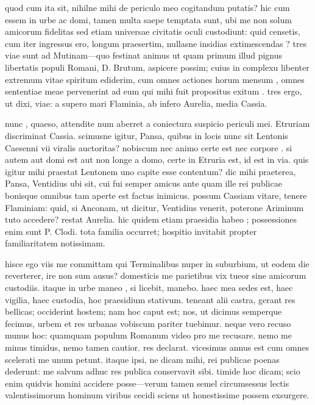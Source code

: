  quod cum ita sit, nihilne mihi de periculo meo cogitandum putatis? hic cum essem in urbe ac domi, tamen multa saepe temptata sunt, ubi me non solum amicorum fidelitas sed etiam universae civitatis oculi custodiunt: quid censetis, cum iter ingressus ero, longum praesertim, nullasne insidias extimescendas ? tres viae sunt ad Mutinam—quo festinat animus ut quam primum illud pignus libertatis populi Romani, D. Brutum, aspicere possim; cuius in complexu libenter extremum vitae spiritum ediderim, cum omnes actiones horum mensum , omnes sententiae meae pervenerint ad eum qui mihi fuit propositus exitum . tres ergo, ut dixi, viae: a supero mari Flaminia, ab infero Aurelia, media Cassia.

 nunc , quaeso, attendite num aberret a coniectura suspicio periculi mei. Etruriam discriminat Cassia. scimusne igitur, Pansa, quibus in locis nunc sit Lentonis Caesenni vii viralis auctoritas? nobiscum nec animo certe est nec corpore . si autem aut domi est aut non longe a domo, certe in Etruria est, id est in via. quis igitur mihi praestat Lentonem uno capite esse contentum? dic mihi praeterea, Pansa, Ventidius ubi sit, cui fui semper amicus ante quam ille rei publicae bonisque omnibus tam aperte est factus inimicus. possum Cassiam vitare, tenere Flaminiam: quid, si Anconam, ut dicitur, Ventidius venerit, poterone Ariminum tuto accedere? restat Aurelia. hic quidem etiam praesidia habeo ; possessiones enim sunt P. Clodi. tota familia occurret; hospitio invitabit propter familiaritatem notissimam.

 hisce ego viis me committam qui Terminalibus nuper in suburbium, ut eodem die reverterer, ire non sum ausus? domesticis me parietibus vix tueor sine amicorum custodiis. itaque in urbe maneo , si licebit, manebo. haec mea sedes est, haec vigilia, haec custodia, hoc praesidium stativum. teneant alii castra, gerant res bellicas; occiderint hostem; nam hoc caput est; nos, ut dicimus semperque fecimus, urbem et res urbanas vobiscum pariter tuebimur. neque vero recuso munus hoc: quamquam populum Romanum video pro me recusare. nemo me minus timidus, nemo tamen cautior. res declarat. vicesimus annus est cum omnes scelerati me unum petunt. itaque ipsi, ne dicam mihi, rei publicae poenas dederunt: me salvum adhuc res publica conservavit sibi. timide hoc dicam; scio enim quidvis homini accidere posse—verum tamen semel circumsessus lectis valentissimorum hominum viribus cecidi sciens ut honestissime possem exsurgere.

